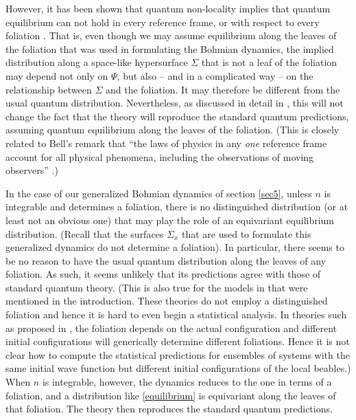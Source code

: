 \documentclass[12pt]{article}
\begin{document}
However, it has been shown that quantum non-locality implies that
quantum equilibrium can not hold in every reference frame, or with
respect to every foliation \cite{berndl96a}. That is, even though we
may assume equilibrium along the leaves of the foliation that was used
in formulating the Bohmian dynamics, the implied distribution along a
space-like hypersurface $\Sigma$ that is not a leaf of the foliation
may depend not only on $\Psi$, but also -- and in a complicated way
-- on the relationship between $\Sigma$ and the foliation. It may
therefore be different from the usual quantum
distribution. Nevertheless, as discussed in detail in
\cite{berndl96a,duerr99}, this will not change the fact that the
theory will reproduce the standard quantum predictions, assuming
quantum equilibrium along the leaves of the foliation. (This is closely related to Bell's remark that ``the laws of
    physics in any \emph{one} reference frame account for all physical
    phenomena, including the observations of moving observers'' \cite[p.\ 77]{bell76b}.) 

In the case of our generalized Bohmian dynamics of section \ref{sec5}, unless $n$ is integrable and determines a foliation, there is no distinguished distribution (or at least not an obvious one) that may play the role of an equivariant equilibrium distribution. (Recall that the surfaces $\Sigma_x$ that are used to formulate this generalized dynamics do not determine a foliation). In particular, there seems to be no reason to have the usual quantum distribution along the leaves of any foliation. As such, it seems unlikely that its predictions agree with those of standard quantum theory. (This is also true for the models in \cite{bell84,horton04,squires93,berndl96a,goldstein03,horton01,dewdney02,nikolic05b} that were mentioned in the introduction. These theories do not employ a distinguished foliation and hence it is hard to even begin a statistical analysis. In theories such as proposed in \cite{bell84,horton04}, the foliation depends on the actual configuration and different initial configurations will generically determine different foliations. Hence it is not clear how to compute the statistical predictions for ensembles of systems with the same initial wave function but different initial configurations of the local beables.) When $n$ is integrable, however, the dynamics reduces to the one in terms of a foliation, and a distribution like \eqref{equilibrium} is equivariant along the leaves of that foliation. The theory then reproduces the standard quantum predictions. 
\end{document}
